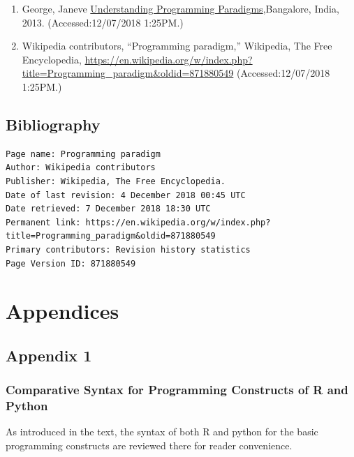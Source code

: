 \documentclass[]{book}
\theoremstyle{definition}
\theoremstyle{definition}
\theoremstyle{definition}
\theoremstyle{remark}
\begin{document}
\begin{enumerate}
\def\labelenumi{\arabic{enumi}.}
\setcounter{enumi}{14}
\item
  George, Janeve
  \href{http://www.janeve.me/software-programming/understanding-programming-paradigms}{Understanding
  Programming Paradigms},Bangalore, India, 2013. (Accessed:12/07/2018
  1:25PM.)
\item
  Wikipedia contributors, ``Programming paradigm,'' Wikipedia, The Free
  Encyclopedia,
  \url{https://en.wikipedia.org/w/index.php?title=Programming_paradigm\&oldid=871880549}
  (Accessed:12/07/2018 1:25PM.)
\end{enumerate}

\chapter{Bibliography}\label{bibliography}

\begin{verbatim}
Page name: Programming paradigm
Author: Wikipedia contributors
Publisher: Wikipedia, The Free Encyclopedia.
Date of last revision: 4 December 2018 00:45 UTC
Date retrieved: 7 December 2018 18:30 UTC
Permanent link: https://en.wikipedia.org/w/index.php?title=Programming_paradigm&oldid=871880549
Primary contributors: Revision history statistics
Page Version ID: 871880549
\end{verbatim}

\part{Appendices}\label{part-appendices}

\chapter{Appendix 1}\label{appendix-1}

\section{Comparative Syntax for Programming Constructs of R and
Python}\label{comparative-syntax-for-programming-constructs-of-r-and-python}

As introduced in the text, the syntax of both R and python for the basic
programming constructs are reviewed there for reader convenience.
\end{document}

